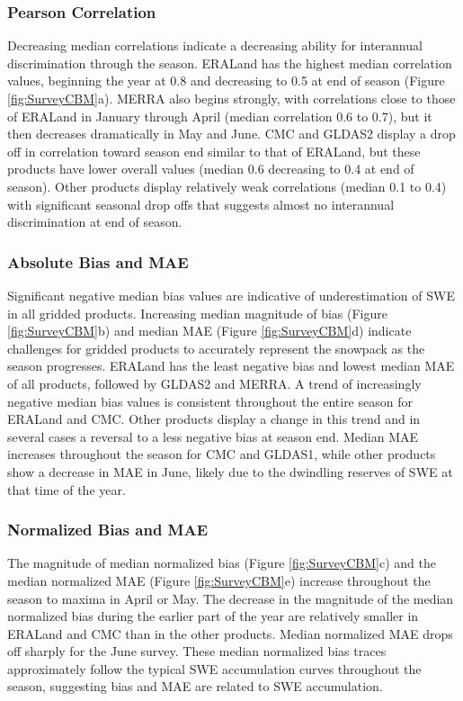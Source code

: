 \documentclass[12pt]{article}
\begin{document}
\subsubsection{Pearson Correlation}
Decreasing median correlations indicate a decreasing ability for interannual discrimination through the season.  ERALand has the highest median correlation values, beginning the year at 0.8 and decreasing to 0.5 at end of season (Figure \ref{fig:SurveyCBM}a).  MERRA also begins strongly, with correlations close to those of ERALand in January through April (median correlation 0.6 to 0.7), but it then decreases dramatically in May and June.  CMC and GLDAS2 display a drop off in correlation toward season end similar to that of ERALand, but these products have lower overall values (median 0.6 decreasing to 0.4 at end of season).  Other products display relatively weak correlations (median 0.1 to 0.4) with significant seasonal drop offs that suggests almost no interannual discrimination at end of season.

\subsubsection{Absolute Bias and MAE}
Significant negative median bias values are indicative of underestimation of SWE in all gridded products.  Increasing median magnitude of bias (Figure \ref{fig:SurveyCBM}b) and median MAE (Figure \ref{fig:SurveyCBM}d) indicate challenges for gridded products to accurately represent the snowpack as the season progresses.  ERALand has the least negative bias and lowest median MAE of all products, followed by GLDAS2 and MERRA.  A trend of increasingly negative median bias values is consistent throughout the entire season for ERALand and CMC.  Other products display a change in this trend and in several cases a reversal to a less negative bias at season end.  Median MAE increases throughout the season for CMC and GLDAS1, while other products show a decrease in MAE in June, likely due to the dwindling reserves of SWE at that time of the year.

\subsubsection{Normalized Bias and MAE}
The magnitude of median normalized bias (Figure \ref{fig:SurveyCBM}c) and the median normalized MAE (Figure \ref{fig:SurveyCBM}e) increase throughout the season to maxima in April or May.  The decrease in the magnitude of the median normalized bias during the earlier part of the year are relatively smaller in ERALand and CMC than in the other products.  Median normalized MAE drops off sharply for the June survey.  These median normalized bias traces approximately follow the typical SWE accumulation curves throughout the season, suggesting bias and MAE are related to SWE accumulation. 
\end{document}
